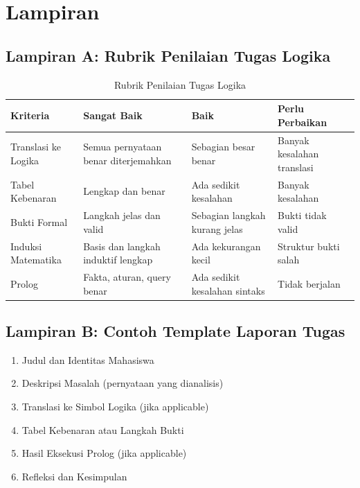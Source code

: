 \chapter*{Lampiran}

\section*{Lampiran A: Rubrik Penilaian Tugas Logika}

\begin{table}[H]
\centering
\small
\begin{tabular}{|>{\raggedright\arraybackslash}p{3cm}|>{\raggedright\arraybackslash}p{3.5cm}|>{\raggedright\arraybackslash}p{3.5cm}|>{\raggedright\arraybackslash}p{3.5cm}|}
\hline
\textbf{Kriteria} & \textbf{Sangat Baik} & \textbf{Baik} & \textbf{Perlu Perbaikan} \\
\hline
Translasi ke Logika & Semua pernyataan benar diterjemahkan & Sebagian besar benar & Banyak kesalahan translasi \\
\hline
Tabel Kebenaran & Lengkap dan benar & Ada sedikit kesalahan & Banyak kesalahan \\
\hline
Bukti Formal & Langkah jelas dan valid & Sebagian langkah kurang jelas & Bukti tidak valid \\
\hline
Induksi Matematika & Basis dan langkah induktif lengkap & Ada kekurangan kecil & Struktur bukti salah \\
\hline
Prolog & Fakta, aturan, query benar & Ada sedikit kesalahan sintaks & Tidak berjalan \\
\hline
\end{tabular}
\caption{Rubrik Penilaian Tugas Logika}
\end{table}

\section*{Lampiran B: Contoh Template Laporan Tugas}
\begin{enumerate}
  \item Judul dan Identitas Mahasiswa
  \item Deskripsi Masalah (pernyataan yang dianalisis)
  \item Translasi ke Simbol Logika (jika applicable)
  \item Tabel Kebenaran atau Langkah Bukti
  \item Hasil Eksekusi Prolog (jika applicable)
  \item Refleksi dan Kesimpulan
\end{enumerate}


